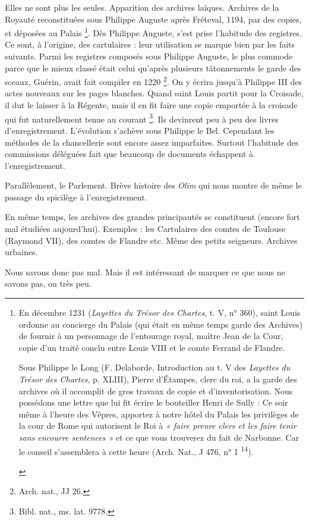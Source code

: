 \documentclass[french,twoside]{book} %
\begin{document}
Elles ne sont plus les seules. Apparition des archives laïques. Archives de la Royauté reconstituées sous Philippe Auguste après Fréteval, 1194, par des copies, et déposées au Palais \footnote{
\begin{listalpha}[itemsep=0pt,]
\item En décembre 1231 ({\itshape Layettes du Trésor des Chartes}, t. V, n° 360), saint Louis ordonne au concierge du Palais (qui était en même temps garde des Archives) de fournir à un personnage de l’entourage royal, maître Jean de la Cour, copie d’un traité conclu entre Louis VIII et le comte Ferrand de Flandre.
\item Sous Philippe le Long (F. Delaborde, Introduction au t. V des {\itshape Layettes du Trésor des Chartes}, p. XLIII), Pierre d’Étampes, clerc du roi, a la garde des archives où il accomplit de gros travaux de copie et d’inventorisation. Nous possédons une lettre que lui fit écrire le bouteiller Henri de Sully : Ce soir même à l’heure des Vêpres, apportez à notre hôtel du Palais les privilèges de la cour de Rome qui autorisent le Roi à \emph{« faire prenre clers et les faire tenir sans encourre sentences »} et ce que vous trouverez du fait de Narbonne. Car le conseil s’assemblera à cette heure (Arch. Nat., J 476, n° 1 \textsuperscript{14}).

\end{listalpha}}. Dès Philippe Auguste, s’est prise l’habitude des registres. Ce sont, à l’origine, des cartulaires : leur utilisation se marque bien par les faits suivants. Parmi les registres composés sous Philippe Auguste, le plus commode parce que le mieux classé était celui qu’après plusieurs tâtonnements le garde des sceaux, Guérin, avait fait compiler en 1220 \footnote{Arch. nat., JJ 26.}. On y écrira jusqu’à Philippe III des actes nouveaux sur les pages blanches. Quand saint Louis partit pour la Croisade, il dut le laisser à la Régente, mais il en fit faire une copie emportée à la croisade qui fut naturellement tenue au courant \footnote{Bibl. nat., ms. lat. 9778.}. Ils devinrent peu à peu des livres d’enregistrement. L’évolution s’achève sous Philippe le Bel. Cependant les méthodes de la chancellerie sont encore assez imparfaites. Surtout l’habitude des commissions déléguées fait que beaucoup de documents échappent à l’enregistrement.\par
\label{p3} Parallèlement, le Parlement. Brève histoire des {\itshape Olim} qui nous montre de même le passage du spicilège à l’enregistrement.\par
En même temps, les archives des grandes principautés se constituent (encore fort mal étudiées aujourd’hui). Exemples : les Cartulaires des comtes de Toulouse (Raymond VII), des comtes de Flandre etc. Même des petits seigneurs. Archives urbaines.\par
Nous savons donc pas mal. Mais il est intéressant de marquer ce que nous ne savons pas, ou très peu.\par
\end{document}
